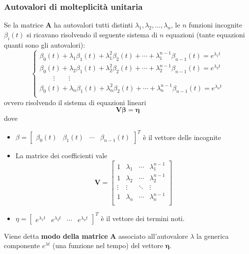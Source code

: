 \documentclass[a4paper]{article}
\renewcommand{\vec}{\bm}
\theoremstyle{definition}
\begin{document}
		\subsubsection{Autovalori di molteplicità unitaria}
			Se la matrice $ \vec{A} $ ha autovalori tutti distinti $ \lambda_1, \lambda_2,\dots, \lambda_n $, le $ n $ funzioni incognite $ \beta_i(t) $ si ricavano risolvendo il seguente sistema di $ n $ equazioni (tante equazioni quanti sono gli autovalori):
			\[
				\begin{cases}
					\beta_0 (t) + \lambda_1\beta_1 (t) + \lambda_1^2\beta_2 (t) + \cdots + \lambda_1^{n-1} \beta_{n-1}(t) = e^{\lambda_1 t} \\
					\beta_0 (t) + \lambda_2\beta_1 (t) + \lambda_2^2\beta_2 (t) + \cdots + \lambda_2^{n-1} \beta_{n-1}(t) = e^{\lambda_2 t} \\
					\qquad \vdots \qquad \vdots \\
					\beta_0 (t) + \lambda_n\beta_1 (t) + \lambda_n^2\beta_2 (t) + \cdots + \lambda_n^{n-1} \beta_{n-1}(t) = e^{\lambda_n t} \\
				\end{cases}
			\]
			ovvero risolvendo il sistema di equazioni lineari
			\[
				\vec{V}\vec{\beta} = \vec{\eta}
			\]
			dove
			\begin{itemize}
				\item $ \beta = \begin{bmatrix}
					\beta_0(t) & \beta_1(t) & \cdots& \beta_{n-1}(t)
				\end{bmatrix}^T $ è il vettore delle incognite
				\item La matrice dei coefficienti vale
				\[
					\vec{V} = 
					\begin{bmatrix}
						1 & \lambda_1 & \cdots & \lambda_1^{n-1} \\
						1 & \lambda_2 & \cdots & \lambda_2^{n-1} \\
						\vdots & \vdots & \ddots & \vdots \\
						1 & \lambda_n & \cdots & \lambda_n^{n-1} \\
					\end{bmatrix}
				\]
				\item $ \eta = \begin{bmatrix}
				e^{\lambda_1 t} & e^{\lambda_2 t} & \cdots & e^{\lambda_n t}
				\end{bmatrix}^T $ è il vettore dei termini noti.
			\end{itemize}
		
			Viene detta \textbf{modo della matrice} $ \vec{A} $ associato all'autovalore $ \lambda $ la generica componente $ e^{\lambda t} $ (una funzione nel tempo) del vettore  $ \vec{\eta} $.
			
\end{document}
